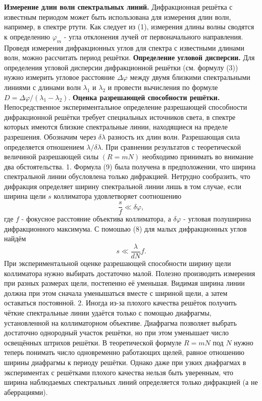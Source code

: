 \documentclass[a4paper, 12pt]{article}
\begin{document}
\textbf{Измерение длин волн спектральных линий.} Дифракционная решётка с известным периодом может быть использована для измерения длин волн, например, в спектре ртути.
Как следует из (1), измерения длины волны сводятся к определению $\varphi_m$ - угла отклонения лучей от первоначального направления.
Проведя измерения дифракционных углов для спектра с известными длинами волн, можно рассчитать период решётки.
\textbf{Определение угловой дисперсии.} Для определения угловой дисперсии дифракционной решётки (см. формулу (3)) нужно измерить угловое расстояние $\Delta \varphi$ между двумя близкими спектральными линиями с длинами волн $\lambda_1$ и $\lambda_2$ и провести вычисления по формуле $D=\Delta \varphi /\left(\lambda_1-\lambda_2\right)$. \textbf{Оценка разрешающей способности решётки.} Непосредственное экспериментальное определение разрешающей способности дифракционной
решётки требует специальных источников света, в спектре которых имеются близкие спектральные линии, находящиеся на пределе разрешения. Обозначим через $\delta \lambda$ разность их длин волн. Разрешающая сила определяется отношением $\lambda / \delta \lambda$. При сравнении результатов с теоретической величиной разрешающей силы $(R=m N)$ необходимо принимать во внимание два обстоятельства.
1. Формула (9) была получена в предположении, что ширина спектральной линии обусловлена только дифракцией. Нетрудно сообразить, что дифракция определяет ширину спектральной линии лишь в том случае, если ширина щели $s$ коллиматора удовлетворяет соотношению
\begin{equation}
	\frac{s}{f} \ll \delta \varphi,
\end{equation}
где $f$ - фокусное расстояние объектива коллиматора, а $\delta \varphi$ - угловая полуширина дифракционного максимума. С помошью (8) для малых дифракционных углов найдём
\begin{equation}
	s \ll \frac{\lambda}{d N} f .
\end{equation}
При экспериментальной оценке разрешающей способности ширину щели коллиматора нужно выбирать достаточно малой. Полезно производить измерения при разных размерах щели, постепенно её уменьшая. Видимая ширина линии должна при этом сначала уменышаться вместе с шириной щели, а затем оставаться постоянной.
2. Иногда из-за плохого качества решёток получить чёткие спектральные линии удаётся только с помощью диафрагмы, установленной на коллиматорном объективе. Диафрагма позволяет выбрать достаточно однородный участок решётки, но при этом уменышает число освещённых штрихов решётки. В теоретической формуле $R=m N$ под $N$ нужно теперь понимать число одновременно работающих щелей, равное отношению ширины диафрагмы к периоду решётки. Однако даже при узких диафрагмах в экспериментах с решётками плохого качества нельзя быть
уверенным, что ширина наблюдаемых спектральных линий определяется только дифракцией (а не аберрациями).
\end{document}

